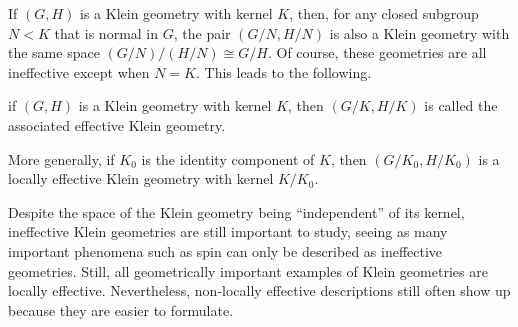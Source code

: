 If $(G,H)$ is a Klein geometry with kernel $K$, then, for any closed subgroup $N<K$ that is normal in $G$, the pair $(G\slash N,H\slash N)$ is also a Klein geometry with the same space $(G\slash N)\slash(H\slash N)\cong G\slash H$. Of course, these geometries are all ineffective except when $N=K$. This leads to the following.

\begin{defn}
    if $(G,H)$ is a Klein geometry with kernel $K$, then $(G\slash K,H\slash K)$ is called the associated effective Klein geometry.
\end{defn}

More generally, if $K_0$ is the identity component of $K$, then $(G\slash K_0,H\slash K_0)$ is a locally effective Klein geometry with kernel $K\slash K_0$.

\begin{rem}
    Despite the space of the Klein geometry being ``independent'' of its kernel, ineffective Klein geometries are still important to study, seeing as many important phenomena such as spin can only be described as ineffective geometries. Still, all geometrically important examples of Klein geometries are locally effective. Nevertheless, non-locally effective descriptions still often show up because they are easier to formulate. 
\end{rem}



